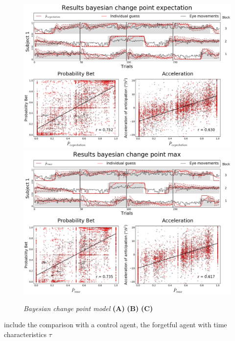 \documentclass[profile,final,english, draft]{article}%
\begin{document}
\begin{figure}%

\begin{center} 
    \includegraphics[width=1\linewidth]{results_bayesianchangepoint_e}
    \includegraphics[width=1\linewidth]{results_bayesianchangepoint_m}
\end{center}
\caption{\emph{Bayesian change point model} \textbf{(A)} 
\textbf{(B)} 
\textbf{(C)}  }
\label{fig:results_psycho}
\end{figure}

include the comparison with a control agent, the forgetful agent with time characteristics $\tau$
\end{document}
